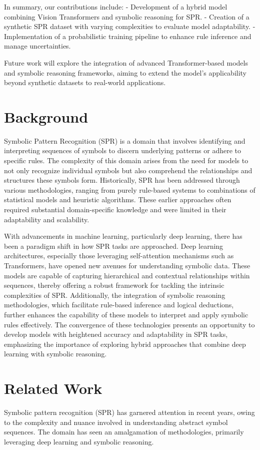 \documentclass{article}
\begin{document}
In summary, our contributions include:
- Development of a hybrid model combining Vision Transformers and symbolic reasoning for SPR.
- Creation of a synthetic SPR dataset with varying complexities to evaluate model adaptability.
- Implementation of a probabilistic training pipeline to enhance rule inference and manage uncertainties.

Future work will explore the integration of advanced Transformer-based models and symbolic reasoning frameworks, aiming to extend the model’s applicability beyond synthetic datasets to real-world applications.

\section{Background}
Symbolic Pattern Recognition (SPR) is a domain that involves identifying and interpreting sequences of symbols to discern underlying patterns or adhere to specific rules. The complexity of this domain arises from the need for models to not only recognize individual symbols but also comprehend the relationships and structures these symbols form. Historically, SPR has been addressed through various methodologies, ranging from purely rule-based systems to combinations of statistical models and heuristic algorithms. These earlier approaches often required substantial domain-specific knowledge and were limited in their adaptability and scalability.
 
With advancements in machine learning, particularly deep learning, there has been a paradigm shift in how SPR tasks are approached. Deep learning architectures, especially those leveraging self-attention mechanisms such as Transformers, have opened new avenues for understanding symbolic data. These models are capable of capturing hierarchical and contextual relationships within sequences, thereby offering a robust framework for tackling the intrinsic complexities of SPR. Additionally, the integration of symbolic reasoning methodologies, which facilitate rule-based inference and logical deductions, further enhances the capability of these models to interpret and apply symbolic rules effectively. The convergence of these technologies presents an opportunity to develop models with heightened accuracy and adaptability in SPR tasks, emphasizing the importance of exploring hybrid approaches that combine deep learning with symbolic reasoning.
\section{Related Work}
Symbolic pattern recognition (SPR) has garnered attention in recent years, owing to the complexity and nuance involved in understanding abstract symbol sequences. The domain has seen an amalgamation of methodologies, primarily leveraging deep learning and symbolic reasoning. 
\end{document}
